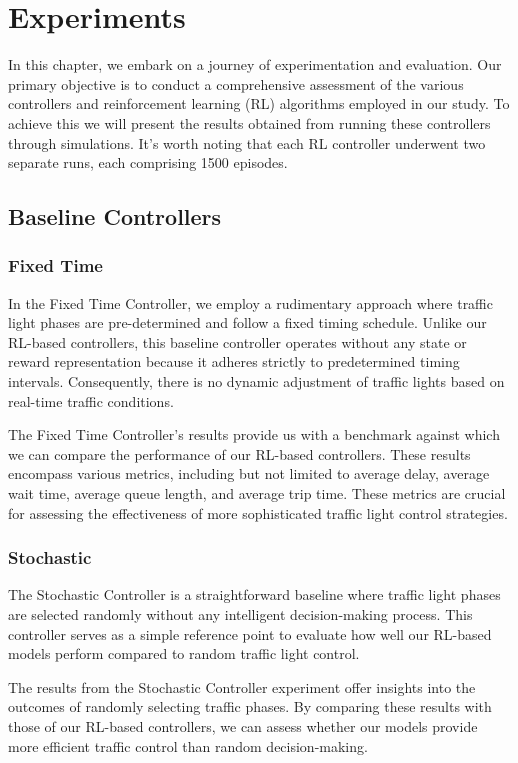 \chapter{Experiments}
In this chapter, we embark on a journey of experimentation and evaluation. Our primary objective is to conduct a comprehensive assessment of the various controllers and reinforcement learning (RL) algorithms employed in our study. To achieve this we will present the results obtained from running these controllers through simulations. It's worth noting that each RL controller underwent two separate runs, each comprising 1500 episodes.

\section{Baseline Controllers}
\subsection{Fixed Time}
In the Fixed Time Controller, we employ a rudimentary approach where traffic light phases are pre-determined and follow a fixed timing schedule. Unlike our RL-based controllers, this baseline controller operates without any state or reward representation because it adheres strictly to predetermined timing intervals. Consequently, there is no dynamic adjustment of traffic lights based on real-time traffic conditions.

The Fixed Time Controller's results provide us with a benchmark against which we can compare the performance of our RL-based controllers. These results encompass various metrics, including but not limited to average delay, average wait time, average queue length, and average trip time. These metrics are crucial for assessing the effectiveness of more sophisticated traffic light control strategies.

\subsection{Stochastic}
The Stochastic Controller is a straightforward baseline where traffic light phases are selected randomly without any intelligent decision-making process. This controller serves as a simple reference point to evaluate how well our RL-based models perform compared to random traffic light control.

The results from the Stochastic Controller experiment offer insights into the outcomes of randomly selecting traffic phases. By comparing these results with those of our RL-based controllers, we can assess whether our models provide more efficient traffic control than random decision-making. 

